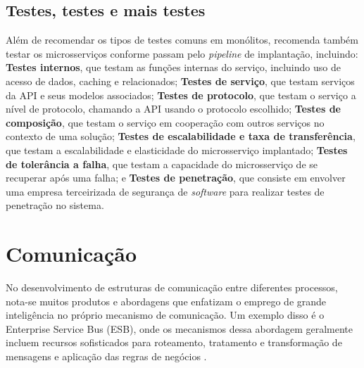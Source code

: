 \subsection{Testes, testes e mais testes}
Além de recomendar os tipos de testes comuns em monólitos,  recomenda também testar os microsserviços conforme passam pelo \emph{pipeline} de implantação, incluindo: \textbf{Testes internos}, que testam as funções internas do serviço, incluindo uso de acesso de dados, caching e relacionados; \textbf{Testes de serviço}, que testam serviços da API e seus modelos associados; \textbf{Testes de protocolo}, que testam o serviço a nível de protocolo, chamando a API usando o protocolo escolhido; \textbf{Testes de composição}, que testam o serviço em cooperação com outros serviços no contexto de uma solução; \textbf{Testes de escalabilidade e taxa de transferência}, que testam a escalabilidade e elasticidade do microsserviço implantado; \textbf{Testes de tolerância a falha}, que testam a capacidade do microsserviço de se recuperar após uma falha; e \textbf{Testes de penetração}, que consiste em envolver uma empresa terceirizada de segurança de \emph{software} para realizar testes de penetração no sistema. \cite{Familiar2015}



\section{Comunicação}\label{secao-comunicacao}


No desenvolvimento de estruturas de comunicação entre diferentes processos, nota-se muitos produtos e abordagens que enfatizam o emprego de grande inteligência no próprio mecanismo de comunicação. Um exemplo disso é o Enterprise Service Bus (ESB), onde os mecanismos dessa abordagem geralmente incluem recursos sofisticados para roteamento, tratamento e transformação de mensagens e aplicação das regras de negócios \cite{martin-fowler-microservices}.


